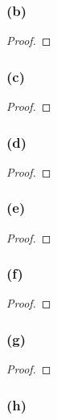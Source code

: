 \documentclass[14pt]{extarticle}
\begin{document}
\subsubsection{(b)}

\begin{proof}

\end{proof}

\subsubsection{(c)}

\begin{proof}

\end{proof}

\subsubsection{(d)}

\begin{proof}

\end{proof}

\subsubsection{(e)}

\begin{proof}

\end{proof}

\subsubsection{(f)}

\begin{proof}

\end{proof}

\subsubsection{(g)}

\begin{proof}

\end{proof}

\subsubsection{(h)}
\end{document}
